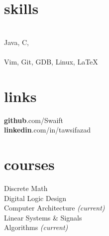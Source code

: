 \documentclass[12pt]{cv}
\begin{document}
\section{skills}
 \\
Java\sep
C\sep
\CC\\

 \\
Vim\sep
Git\sep
GDB\sep
Linux\sep
\LaTeX\\
\hfill

\section{links}
\textbf{github}.com/Swaift \\
\textbf{linkedin}.com/in/tawsifazad \\

\section{courses}
Discrete Math\\
Digital Logic Design\\
Computer Architecture \textit{(current)}\\
Linear Systems \& Signals\\
Algorithms \textit{(current)}\\
\end{document}
